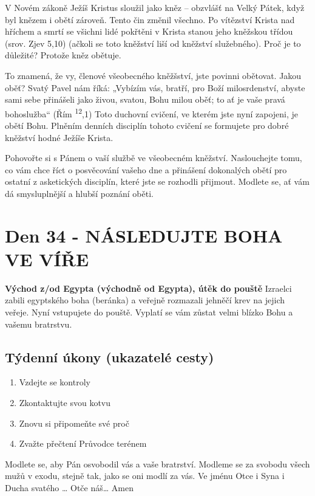 \documentclass[11pt]{article}
\newcommand{\zacatekPatyTyden}{
  \textbf{Východ z/od Egypta (východně od Egypta), útěk do pouště} \newline
  Izraelci zabili egyptského boha (beránka) a veřejně rozmazali jehněčí krev na jejich veřeje. Nyní vstupujete
  do pouště. Vyplatí se vám zůstat velmi blízko Bohu a vašemu bratrstvu.

\subsection*{Týdenní úkony (ukazatelé cesty)}
\begin{enumerate}
  \item Vzdejte se kontroly
  \item Zkontaktujte svou kotvu
  \item Znovu si připomeňte své proč
  \item Zvažte přečtení Průvodce terénem
\end{enumerate}
Modlete se, aby Pán osvobodil vás a vaše bratrství. \newline
Modleme se za svobodu všech mužů v exodu, stejně tak, jako se oni modlí za vás.\newline
Ve jménu Otce i Syna i Ducha svatého …  Otče náš… Amen
}
\begin{document}
V Novém zákoně Ježíš Kristus sloužil jako kněz – obzvlášť na Velký Pátek, když byl knězem i obětí zároveň. Tento čin změnil
všechno. Po vítězství Krista nad hříchem a smrtí se všichni lidé pokřtěni v Krista stanou jeho kněžskou třídou (srov. Zjev 5,10)
(ačkoli se toto kněžství liší od kněžství služebného). Proč je to důležité? Protože kněz obětuje.

To znamená, že vy, členové všeobecného kněžšství, jste povinni obětovat. Jakou oběť? Svatý Pavel nám říká: „Vybízím vás, bratří,
pro Boží milosrdenství, abyste sami sebe přinášeli jako živou, svatou, Bohu milou oběť; to ať je vaše pravá bohoslužba“ (Řím
\textsuperscript{12},1) Toto duchovní cvičení, ve kterém jste nyní zapojeni, je obětí Bohu. Plněním denních disciplín tohoto cvičení se formujete pro
dobré kněžství hodné Ježíše Krista.

Pohovořte si s Pánem o vaší službě ve všeobecném kněžství. Naslouchejte tomu, co vám chce říct o posvěcování vašeho dne a
přinášení dokonalých obětí pro ostatní z asketických disciplín, které jste se rozhodli přijmout. Modlete se, ať vám dá smysluplnější
a hlubší poznání oběti.

\newpage
\section{Den 34 - NÁSLEDUJTE BOHA VE VÍŘE}
\zacatekPatyTyden
\end{document}
